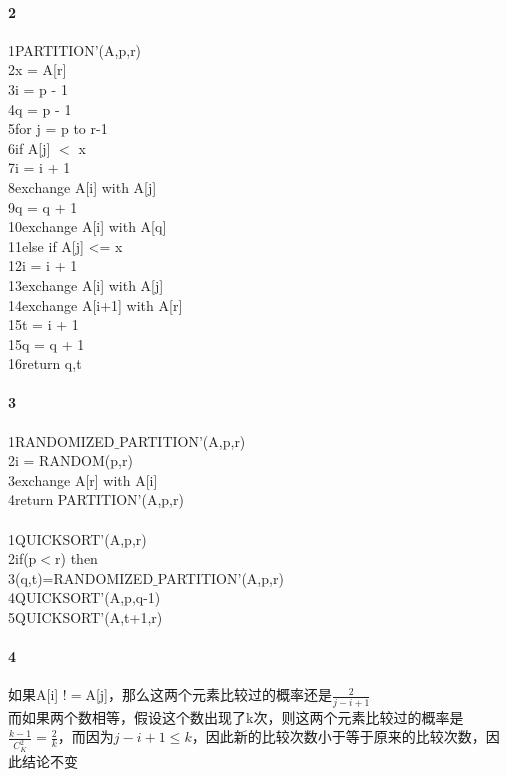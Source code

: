 \documentclass{article}
\begin{document}
\begin{CJK}{UTF8}{gkai}
\paragraph{2}

1\qquad PARTITION'(A,p,r)\\
2\qquad x = A[r]\\
3\qquad i = p - 1\\
4\qquad q = p - 1\\
5\qquad for j = p  to  r-1\\
6\qquad\qquad if A[j] $<$ x\\
7\qquad\qquad\qquad  i = i + 1\\
8\qquad\qquad\qquad exchange A[i] with A[j]\\
9\qquad\qquad\qquad q = q + 1\\
10\qquad\qquad\qquad exchange A[i] with A[q]\\
11\qquad\qquad else if A[j] <= x\\
12\qquad\qquad\qquad i = i + 1\\
13\qquad\qquad\qquad exchange A[i] with A[j]\\
14\qquad exchange A[i+1] with A[r]\\
15\qquad t = i + 1\\
15\qquad q = q + 1\\
16\qquad return q,t\\
\paragraph{3}

1\qquad RANDOMIZED$\_$PARTITION'(A,p,r)\\
2\qquad i = RANDOM(p,r)\\
3\qquad exchange A[r] with A[i]\\
4\qquad return PARTITION'(A,p,r)\\
\\
1\qquad QUICKSORT'(A,p,r)\\
2\qquad if(p$<$r) then\\
3\qquad (q,t)=RANDOMIZED$\_$PARTITION'(A,p,r)\\
4\qquad QUICKSORT'(A,p,q-1)\\
5\qquad QUICKSORT'(A,t+1,r)\\


\paragraph{4}
如果A[i] $!=$A[j]，那么这两个元素比较过的概率还是$\frac{2}{j-i+1}$\\
而如果两个数相等，假设这个数出现了k次，则这两个元素比较过的概率是$\frac{k-1}{C_{K}^{2}}=\frac{2}{k}$，而因为$j-i+1\leq k$，因此新的比较次数小于等于原来的比较次数，因此结论不变

\end{CJK}
\end{document}
